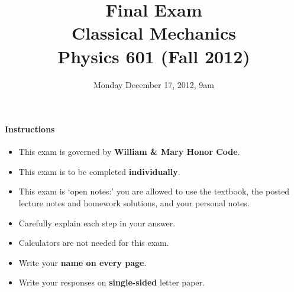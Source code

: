 \documentclass[letterpaper,11pt]{article}
\title{Final Exam \\ Classical Mechanics \\ Physics 601 (Fall 2012)}
\date{Monday December 17, 2012, 9am}
\begin{document}
\maketitle

\paragraph*{Instructions}
\begin{itemize}
 \item This exam is governed by \textbf{William \& Mary Honor Code}.
 \item This exam is to be completed \textbf{individually}.
 \item This exam is `open notes:' you are allowed to use the textbook, the posted lecture notes and homework solutions, and your personal notes.
 \item Carefully explain each step in your answer.
 \item Calculators are not needed for this exam.
 \item Write your \textbf{name on every page}.
 \item Write your responses on \textbf{single-sided} letter paper.
\end{itemize}

\pagebreak
\end{document}
